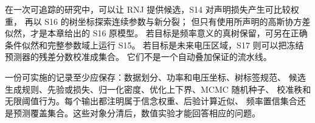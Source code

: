 在一次可追踪的研究中，可以让 RNJ 提供候选，S14 对声明损失产生可比较权重，
再以 S16 的树坐标探索连续参数与新分裂；
但只有使用所声明的高斯协方差似然，才是本章给出的 S16 原模型。
若目标是频率意义的真树保留，可另在正确条件似然和完整参数域上运行 S15。
若目标是未来电压区域，S17 则可以把冻结预测器的残差分数校准成集合。
它们不是一个自动叠加保证的流水线。

一份可实施的记录至少应保存：数据划分、功率和电压坐标、树标签规范、
候选生成规则、先验或损失、归一化密度、优化上下界、MCMC 随机种子、
校准秩和无限阈值行为。每个输出都注明属于信念权重、后验计算近似、
频率置信集合还是预测覆盖集合。这些对象分清后，数值实验才能回答相应的问题。
